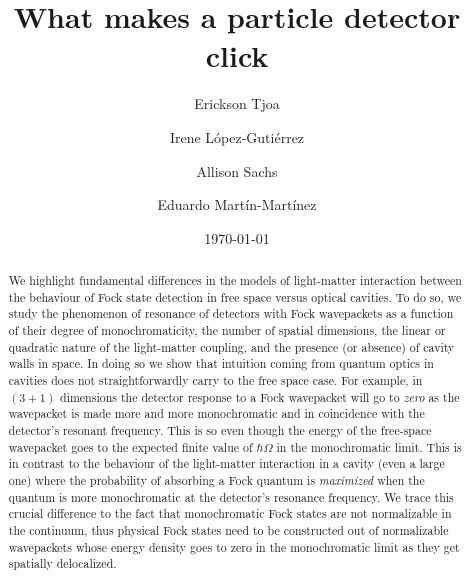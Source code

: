 \documentclass[prd,twocolumn,superscriptaddress,nofootinbib,floatfix,amsmath,amssymb]{revtex4-2}
\begin{document}




\title{What makes a particle detector click}

\author{Erickson Tjoa}

\author{Irene L\'opez-Guti\'errez}
%    
\author{Allison Sachs}

\author{Eduardo Mart\'in-Mart\'inez}

\date{\today}

\begin{abstract}
   
    We highlight fundamental differences in the models of  light-matter interaction between the behaviour of Fock state detection in free space versus optical cavities. To do so, we study the phenomenon of resonance of detectors with Fock wavepackets as a function of their degree of monochromaticity, the number of spatial dimensions, the linear or quadratic nature of the light-matter coupling, and the presence (or absence) of cavity walls in space. In doing so we show that intuition coming from quantum optics in cavities does not straightforwardly carry to the free space case. For example, in $(3+1)$ dimensions the detector response to a Fock wavepacket will go to \textit{zero} as the wavepacket is made more and more monochromatic and in coincidence with the detector's resonant frequency. This is so even though the energy of the free-space wavepacket goes to the expected finite value of $\hbar\Omega$ in the monochromatic limit. This is in contrast to the behaviour of the light-matter interaction in a cavity (even a large one) where the probability of absorbing a Fock quantum is \textit{maximized} when the quantum is more monochromatic at the detector's resonance frequency.  We trace this crucial difference to the fact that monochromatic Fock states are not normalizable in the continuum, thus physical Fock states need to be constructed out of normalizable wavepackets whose energy density goes to zero in the monochromatic limit as they get spatially delocalized.
    
    
\end{abstract}
\end{document}
